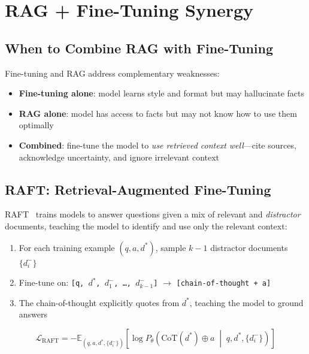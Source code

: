 \section{RAG + Fine-Tuning Synergy}
\label{rag-fine-tuning-synergy}

\subsection{When to Combine RAG with Fine-Tuning}
\label{when-to-combine-rag-with-fine-tuning}

Fine-tuning and RAG address complementary weaknesses:

\begin{itemize}
  \item \textbf{Fine-tuning alone}: model learns style and format but may hallucinate facts
  \item \textbf{RAG alone}: model has access to facts but may not know how to use them optimally
  \item \textbf{Combined}: fine-tune the model to \emph{use retrieved context well}---cite sources, acknowledge uncertainty, and ignore irrelevant context
\end{itemize}

\subsection{RAFT: Retrieval-Augmented Fine-Tuning}
\label{raft-retrieval-augmented-fine-tuning}

RAFT~\cite{zhang2024raft} trains models to answer questions given a mix of relevant and \emph{distractor} documents, teaching the model to identify and use only the relevant context:

\begin{enumerate}
  \item For each training example $(q, a, d^*)$, sample $k-1$ distractor documents $\{d_i^-\}$
  \item Fine-tune on: \texttt{[q, }$d^*$\texttt{, }$d_1^-$\texttt{, \ldots{}, }$d_{k-1}^-$\texttt{]} $\to$ \texttt{[chain-of-thought + a]}
  \item The chain-of-thought explicitly quotes from $d^*$, teaching the model to ground answers
\end{enumerate}

\begin{equation}
  \mathcal{L}_{\text{RAFT}} = -\mathbb{E}_{(q,a,d^*,\{d_i^-\})} \left[
    \log P_\theta\!\left(\text{CoT}(d^*) \oplus a \;\middle|\; q, d^*, \{d_i^-\}\right)
  \right]
\end{equation}

